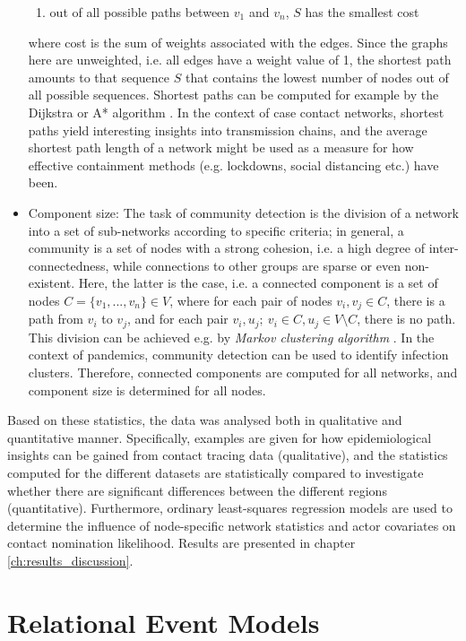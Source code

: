 \begin{itemize}
\begin{enumerate}
		\item out of all possible paths between $v_1$ and $v_n$, $S$ has the smallest cost
	\end{enumerate}
	where cost is the sum of weights associated with the edges. Since the graphs here are unweighted, i.e. all edges have a weight value of 1, the shortest path amounts to that sequence $S$ that contains the lowest number of nodes out of all possible sequences. Shortest paths can be computed for example by the Dijkstra or A* algorithm \cite{dijkstra2022note,hart1968formal}. In the context of case contact networks, shortest paths yield interesting insights into transmission chains, and the average shortest path length of a network might be used as a measure for how effective containment methods (e.g. lockdowns, social distancing etc.) have been.
	\item Component size: The task of community detection is the division of a network into a set of sub-networks according to specific criteria; in general, a community is a set of nodes with a strong cohesion, i.e. a high degree of inter-connectedness, while connections to other groups are sparse or even non-existent. Here, the latter is the case, i.e. a connected component is a set of nodes $C = \{v_1,...,v_n\} \in V$, where for each pair of nodes $v_i,v_j \in C$, there is a path from $v_i$ to $v_j$, and for each pair $v_i,u_j;\: v_i \in C, u_j \in V \setminus C$, there is no path. This division can be achieved e.g. by \emph{Markov clustering algorithm} \cite{community_detection,markov_clustering}. In the context of pandemics, community detection can be used to identify infection clusters. Therefore, connected components are computed for all networks, and component size is determined for all nodes.
\end{itemize}  
\bigskip

\noindent Based on these statistics, the data was analysed both in qualitative and quantitative manner. Specifically, examples are given for how epidemiological insights can be gained from contact tracing data (qualitative), and the statistics computed for the different datasets are statistically compared to investigate whether there are significant differences between the different regions (quantitative). Furthermore, ordinary least-squares regression models are used to determine the influence of node-specific network statistics and actor covariates on contact nomination likelihood. Results are presented in chapter \ref{ch:results_discussion}.

\section{Relational Event Models}
\label{sec:rem}

